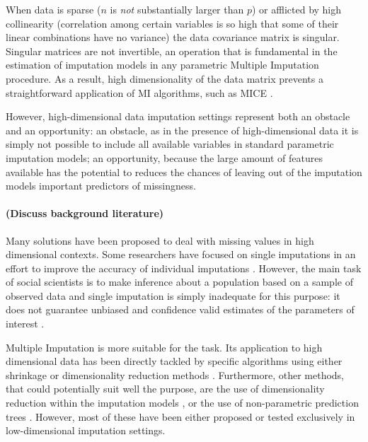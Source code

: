 When data is sparse ($n$ is \emph{not} substantially larger than $p$) or afflicted by high collinearity (correlation among 
certain variables is so high that some of their linear combinations have no variance) the data covariance matrix
is singular. 
Singular matrices are not invertible, an operation that is fundamental in the estimation of imputation models in 
any parametric Multiple Imputation procedure.
As a result, high dimensionality of the data matrix prevents a straightforward application of MI algorithms, 
such as MICE \citep{vanBuuren:2012}.

However, high-dimensional data imputation settings represent both an obstacle and an opportunity: an 
obstacle, as in the presence of high-dimensional data it is simply not possible to include all available variables 
in standard parametric imputation models; 
an opportunity, because the large amount of features available has the potential to reduces the chances of 
leaving out of the imputation models important predictors of missingness.

\paragraph{(Discuss background literature)}
Many solutions have been proposed to deal with missing values in high dimensional contexts. Some researchers
have focused on single imputations in an effort to improve the accuracy of individual imputations \citep{kimEtAl:2005, 
stekhovenBuhlmann:2011, d'ambrosioEtAl:2012}. 
However, the main task of social scientists is to make inference about a population based on a sample of observed 
data and single imputation is simply inadequate for this purpose: it does not guarantee unbiased and confidence 
valid estimates of the parameters of interest \citep{rubin:1996}.

Multiple Imputation is more suitable for the task. Its application to high dimensional data has been directly tackled 
by specific algorithms using either shrinkage or dimensionality reduction methods
\citep{songBelin:2004, zhaoLong:2016, dengEtAl:2016}. 
Furthermore, other methods, that could potentially suit well the purpose, are the use of dimensionality reduction
within the imputation models \citep{howardEtAl:2015}, or the use of non-parametric prediction trees 
\citep{burgetteReiter:2010, dooveEtAl:2014}.
However, most of these have been either proposed or tested exclusively in low-dimensional imputation 
settings.

